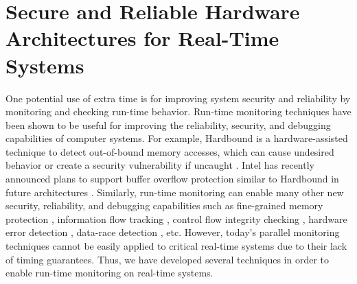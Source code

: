 
\section{Secure and Reliable Hardware Architectures for Real-Time Systems}
\label{sec:intro.security}

One potential use of extra time is for improving system security and
reliability by monitoring and checking run-time behavior.
Run-time monitoring techniques have been shown to be useful for improving the
reliability, security, and debugging capabilities of computer systems. For
example, Hardbound is a hardware-assisted technique to detect out-of-bound
memory accesses, which can cause undesired behavior or create a security
vulnerability if uncaught \cite{hardbound-asplos08}. Intel has recently
announced plans to support buffer overflow protection similar to Hardbound in
future architectures \cite{intel-mpx}. Similarly, run-time monitoring can
enable many other new security, reliability, and debugging capabilities such as
fine-grained memory protection \cite{mondrian-asplos02}, information flow
tracking \cite{dift-asplos04, testudo-micro08}, control flow integrity checking
\cite{hafix-dac15}, hardware error detection \cite{argus-micro07}, data-race
detection \cite{radish-isca12, cord-hpca06}, etc.  
However, today's parallel monitoring techniques cannot be easily applied
to critical real-time systems due to their lack of timing guarantees. Thus, we
have developed several techniques in order to enable run-time monitoring on
real-time systems.


